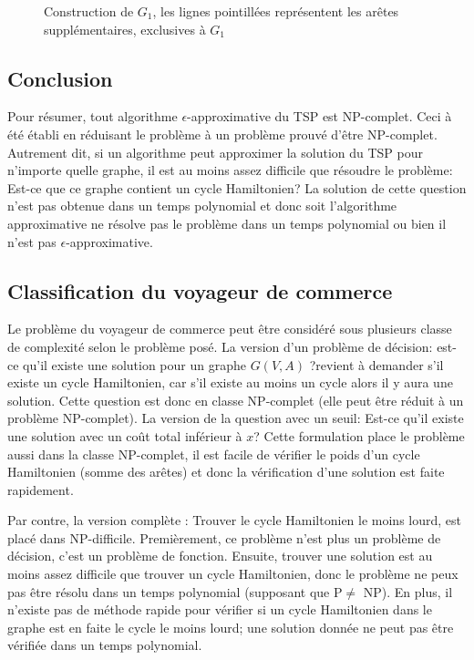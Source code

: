 \documentclass[../main.tex]{subfiles}
\begin{document}
\begin{figure}[ht]
    \centering
    \caption{Construction de $G_1$, les lignes pointillées représentent les arêtes supplémentaires, exclusives à $G_1$}
    \label{fig:epsi_approx}
\end{figure}

\subsection{Conclusion}
Pour résumer, tout algorithme $\epsilon$-approximative du TSP est NP-complet. Ceci à été établi en réduisant le problème à un problème prouvé d'être NP-complet. Autrement dit, si un algorithme peut approximer la solution du TSP pour n'importe quelle graphe, il est au moins assez difficile que résoudre le problème: Est-ce que ce graphe contient un cycle Hamiltonien? La solution de cette question n'est pas obtenue dans un temps polynomial et donc soit l'algorithme approximative ne résolve pas le problème dans un temps polynomial ou bien il n'est pas $\epsilon$-approximative.

\subsection{Classification du voyageur de commerce}
Le problème du voyageur de commerce peut être considéré sous plusieurs classe de complexité selon le problème posé. La version d'un problème de décision: est-ce qu'il existe une solution pour un graphe $G(V,A)$ ?revient à demander s'il existe un cycle Hamiltonien, car s'il existe au moins un cycle alors il y aura une solution. Cette question est donc en classe NP-complet (elle peut être réduit à un problème NP-complet). La version de la question avec un seuil: Est-ce qu'il existe une solution avec un coût total inférieur à $x$? Cette formulation place le problème aussi dans la classe NP-complet, il est facile de vérifier le poids d'un cycle Hamiltonien (somme des arêtes) et donc la vérification d'une solution est faite rapidement.

Par contre, la version \og complète \fg{}: Trouver le cycle Hamiltonien le moins lourd, est placé dans NP-difficile. Premièrement, ce problème n'est plus un problème de décision, c'est un problème de fonction. Ensuite, trouver une solution est au moins assez difficile que trouver un cycle Hamiltonien, donc le problème ne peux pas être résolu dans un temps polynomial (supposant que P$\neq$ NP). En plus, il n'existe pas de méthode rapide pour vérifier si un cycle Hamiltonien dans le graphe est en faite le cycle le moins lourd; une solution donnée ne peut pas être vérifiée dans un temps polynomial.
\end{document}
